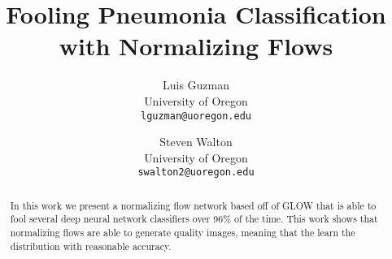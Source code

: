 \documentclass[10pt,twocolumn,letterpaper]{article}
\begin{document}
\title{Fooling Pneumonia Classification with Normalizing Flows}

\author{Luis Guzman\\
University of Oregon\\
{\tt\small lguzman@uoregon.edu}
\and
Steven Walton\\
University of Oregon\\
{\tt\small swalton2@uoregon.edu}
}

\maketitle

\begin{abstract}
    In this work we present a normalizing flow network based off of GLOW that is
    able to fool several deep neural network classifiers over 96\% of the time.
    This work shows that normalizing flows are able to generate quality images,
    meaning that the learn the distribution with reasonable accuracy. 
\end{abstract}







{\small


}
\end{document}
